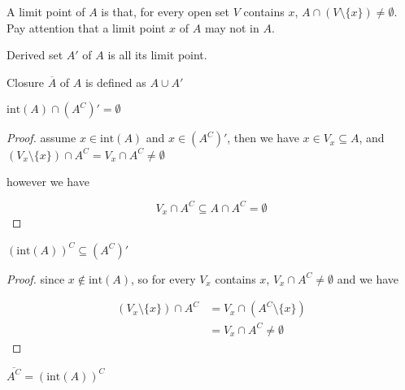 \documentclass[11pt,a4paper]{article}
\begin{document}
\begin{definition}
   A limit point of $A$ is that, for every open set $V$ contains $x$, $A \cap \left( V \setminus \{x\} \right) \ne \emptyset$.
   Pay attention that a limit point $x$ of $A$ may not in $A$. 
\end{definition}

\begin{definition}
    Derived set $A'$ of $A$ is all its limit point.
\end{definition}

\begin{definition}[Closure]
    Closure $\overline{A}$ of $A$ is defined as $A \cup A'$
\end{definition}



\begin{lem}
    $\text{int}(A) \cap (A^C)' = \emptyset$
\end{lem}

\begin{proof}
    assume $x \in \text{int}(A)$ and $x \in (A^C)'$, then we have $x \in V_x \subseteq A$, and 
    $(V_x \setminus \{ x\}) \cap A^C = V_x \cap A^C \ne \emptyset$

    however we have

    \[
        V_x \cap A^C \subseteq A \cap A^C = \emptyset
    \]
\end{proof}


\begin{lem}
    $\left( \text{int}(A) \right)^C \subseteq (A^C)'$
\end{lem}

\begin{proof}
    since $x \notin \text{int}(A)$, so for every $V_x$ contains $x$, $V_x \cap A^C \ne \emptyset$ and we have

    \begin{align*}
        \left( V_x \setminus \{ x \} \right) \cap A^C &= V_x \cap \left( A^C \setminus \{ x \} \right)  \\
        &= V_x \cap A^C  \ne \emptyset
    \end{align*}
\end{proof}

\begin{lem}
    $\overline{A^C} = \left( \text{int}(A) \right)^C $
\end{lem}
\end{document}
